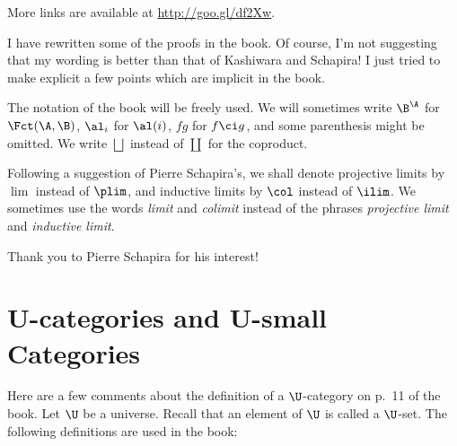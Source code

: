 \documentclass[12pt]{article}
\theoremstyle{remark}
\theoremstyle{definition}
\begin{document}




More links are available at \href{http://goo.gl/df2Xw}{http://goo.gl/df2Xw}. 

I have rewritten some of the proofs in the book. Of course, I'm not suggesting that my wording is better than that of Kashiwara and Schapira! I just tried to make explicit a few points which are implicit in the book. 


The notation of the book will be freely used. We will sometimes write $\B^\A$ for $\Fct(\A,\B)$, $\al_i$ for $\al(i)$, $fg$ for $f\ci g$, and some parenthesis might be omitted. We write $\bigsqcup$\index{$\bigsqcup$} instead of $\coprod$\index{$\coprod$} for the coproduct. 

Following a suggestion of Pierre Schapira's, we shall denote projective limits by $\lim$\index{$\lim$} instead of $\plim$\index{$\plim$}, and inductive limits by $\col$\index{$\col$} instead of $\ilim$\index{$\ilim$}. We sometimes use the words \emph{limit} and \emph{colimit} instead of the phrases \emph{projective limit} and \emph{inductive limit}.

Thank you to Pierre Schapira for his interest!


\section{U-categories and U-small Categories}

Here are a few comments about the definition of a $\U$-category on p.~11 of the book. Let $\U$ be a universe. Recall that an element of $\U$ is called a $\U$-set. The following definitions are used in the book: 
\end{document}
